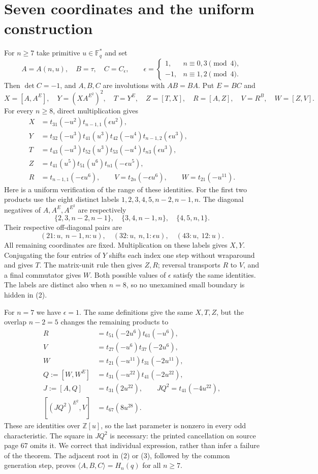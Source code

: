 \documentclass[11pt,a4paper]{article}
\newcommand{\F}{\mathbb F}
\begin{document}
\section{Seven coordinates and the uniform construction}
For $n\ge7$ take primitive $u\in\F_q^*$ and set
\[
 A=A(n,u),\quad B=\tau,\quad C=C_\epsilon,\qquad
 \epsilon=\begin{cases}1,&n\equiv0,3\pmod4,\\
                       -1,&n\equiv1,2\pmod4.
          \end{cases}
\]
Then $\det C=-1$, and $A,B,C$ are involutions with $AB=BA$.
Put $E=BC$ and
\[
 X=[A,A^E],\quad Y=(XA^{E^2})^2,\quad T=Y^E,
 \quad Z=[T,X],\quad R=[A,Z],\quad V=R^B,\quad W=[Z,V].
\]
For every $n\ge8$, direct multiplication gives
\begin{align*}
 X&=t_{31}(-u^2)t_{n-1,1}(\epsilon u^2),\\
 Y&=t_{32}(-u^3)t_{41}(u^3)t_{42}(-u^4)t_{n-1,2}(\epsilon u^3),\\
 T&=t_{43}(-u^3)t_{52}(u^3)t_{53}(-u^4)t_{n3}(\epsilon u^3),\\
 Z&=t_{41}(u^5)t_{51}(u^6)t_{n1}(-\epsilon u^5),\\
 R&=t_{n-1,1}(-\epsilon u^6),\qquad
 V=t_{2n}(-\epsilon u^6),\qquad W=t_{21}(-u^{11}).       \tag{2}
\end{align*}
Here is a uniform verification of the range of these identities.
For the first two products use the eight distinct labels
$1,2,3,4,5,n-2,n-1,n$. The diagonal negatives of $A,A^E,A^{E^2}$
are respectively
\[
 \{2,3,n-2,n-1\},\quad\{3,4,n-1,n\},\quad\{4,5,n,1\}.
\]
Their respective off-diagonal pairs are
\[
 (21:u,\ n-1,n:u),\quad(32:u,\ n,1:\epsilon u),
 \quad(43:u,\ 12:u).
\]
All remaining coordinates are fixed. Multiplication on these labels
gives $X,Y$. Conjugating the four entries of $Y$ shifts each index
one step without wraparound and gives $T$. The matrix-unit rule then
gives $Z,R$; reversal transports $R$ to $V$, and a final commutator
gives $W$. Both possible values of $\epsilon$ satisfy the same
identities. The labels are distinct also when $n=8$, so no unexamined
small boundary is hidden in (2).

For $n=7$ we have $\epsilon=1$. The same definitions give the same
$X,T,Z$, but the overlap $n-2=5$ changes the remaining products to
\begin{align*}
 R&=t_{51}(-2u^6)t_{61}(-u^6),\\
 V&=t_{27}(-u^6)t_{37}(-2u^6),\\
 W&=t_{21}(-u^{11})t_{31}(-2u^{11}),\\
 Q:=[W,W^E]&=t_{31}(-u^{22})t_{41}(-2u^{22}),\\
 J:=[A,Q]&=t_{31}(2u^{22}),\qquad JQ^2=t_{41}(-4u^{22}),\\
 [(JQ^2)^{E^2},V]&=t_{67}(8u^{28}).                    \tag{3}
\end{align*}
These are identities over $\mathbb Z[u]$, so the last parameter is
nonzero in every odd characteristic. The square in $JQ^2$ is necessary:
the printed cancellation on source page 67 omits it. We correct that
individual expression, rather than infer a failure of the theorem.
The adjacent root in (2) or (3), followed by the common generation
step, proves $\langle A,B,C\rangle=H_n(q)$ for all $n\ge7$.
\end{document}
